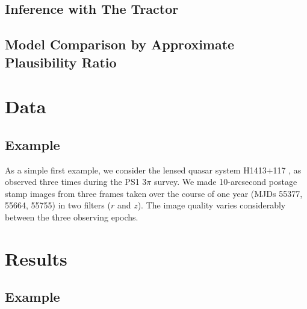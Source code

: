 \documentclass[useAMS,usenatbib]{mn2e}
\begin{document}
\subsection{Inference with The Tractor}
\label{sec:model:tractor}

\subsection{Model Comparison by Approximate Plausibility Ratio}
\label{sec:model:bic}



\section{Data}
\label{sed:data}


\subsection{Example}
\label{sec:data:example}

As a simple first example, we consider the lensed quasar system H1413$+$117
\citep{H1413}, as observed three times during the PS1 $3\pi$ survey. We 
made 10-arcsecond postage stamp images from three frames taken over the
course of one year (MJDs  55377, 55664, 55755) in two filters ($r$ and
$z$). The image quality varies considerably between the three observing
epochs.




\section{Results}
\label{sec:results}

\subsection{Example}
\label{sec:results:example}
\end{document}
